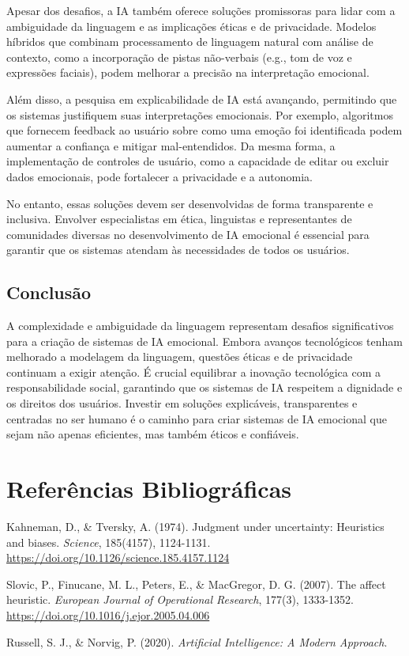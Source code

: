 \documentclass[a4paper,12pt]{report}
\begin{document}
	Apesar dos desafios, a IA também oferece soluções promissoras para lidar com a ambiguidade da linguagem e as implicações éticas e de privacidade. Modelos híbridos que combinam processamento de linguagem natural com análise de contexto, como a incorporação de pistas não-verbais (e.g., tom de voz e expressões faciais), podem melhorar a precisão na interpretação emocional.
	
	Além disso, a pesquisa em explicabilidade de IA está avançando, permitindo que os sistemas justifiquem suas interpretações emocionais. Por exemplo, algoritmos que fornecem feedback ao usuário sobre como uma emoção foi identificada podem aumentar a confiança e mitigar mal-entendidos. Da mesma forma, a implementação de controles de usuário, como a capacidade de editar ou excluir dados emocionais, pode fortalecer a privacidade e a autonomia.
	
	No entanto, essas soluções devem ser desenvolvidas de forma transparente e inclusiva. Envolver especialistas em ética, linguistas e representantes de comunidades diversas no desenvolvimento de IA emocional é essencial para garantir que os sistemas atendam às necessidades de todos os usuários.
	
	\subsection{Conclusão}
	
	A complexidade e ambiguidade da linguagem representam desafios significativos para a criação de sistemas de IA emocional. Embora avanços tecnológicos tenham melhorado a modelagem da linguagem, questões éticas e de privacidade continuam a exigir atenção. É crucial equilibrar a inovação tecnológica com a responsabilidade social, garantindo que os sistemas de IA respeitem a dignidade e os direitos dos usuários. Investir em soluções explicáveis, transparentes e centradas no ser humano é o caminho para criar sistemas de IA emocional que sejam não apenas eficientes, mas também éticos e confiáveis.
	
	
	
	\newpage
	
	\section*{Referências Bibliográficas}
	\begin{description}
		\item Kahneman, D., \& Tversky, A. (1974). Judgment under uncertainty: Heuristics and biases. \textit{Science}, 185(4157), 1124-1131. \url{https://doi.org/10.1126/science.185.4157.1124}
		\item Slovic, P., Finucane, M. L., Peters, E., \& MacGregor, D. G. (2007). The affect heuristic. \textit{European Journal of Operational Research}, 177(3), 1333-1352. \url{https://doi.org/10.1016/j.ejor.2005.04.006}
		\item Russell, S. J., \& Norvig, P. (2020). \textit{Artificial Intelligence: A Modern Approach}.
	\end{description}
	
	
\end{document}
